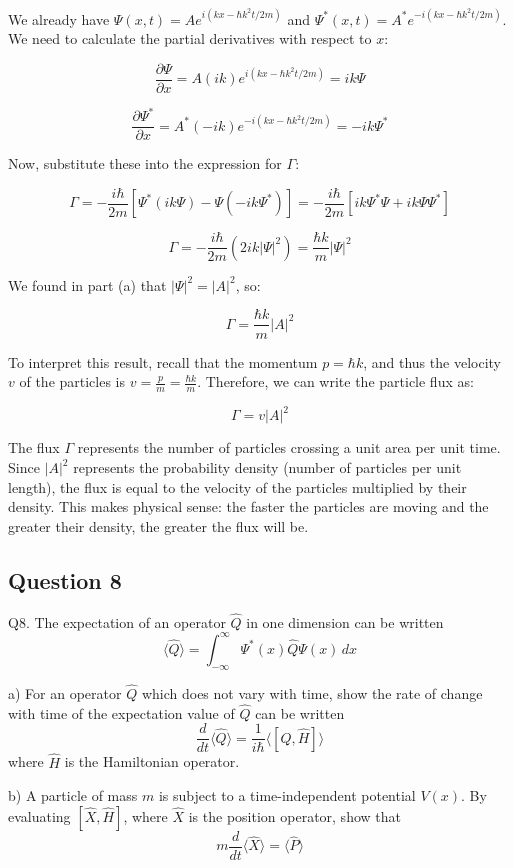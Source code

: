 \documentclass{article}
\begin{document}
We already have $\Psi(x,t) = A e^{i(kx - \hbar k^2 t / 2m)}$ and $\Psi^*(x,t) = A^* e^{-i(kx - \hbar k^2 t / 2m)}$. We need to calculate the partial derivatives with respect to $x$:

\[ \frac{\partial \Psi}{\partial x} = A (ik) e^{i(kx - \hbar k^2 t / 2m)} = ik \Psi \]

\[ \frac{\partial \Psi^*}{\partial x} = A^* (-ik) e^{-i(kx - \hbar k^2 t / 2m)} = -ik \Psi^* \]

Now, substitute these into the expression for $\Gamma$:

\[ \Gamma = -\frac{i \hbar}{2m} \left[ \Psi^* (ik \Psi) - \Psi (-ik \Psi^*) \right] = -\frac{i \hbar}{2m} \left[ ik \Psi^* \Psi + ik \Psi \Psi^* \right] \]

\[ \Gamma = -\frac{i \hbar}{2m} (2ik |\Psi|^2) = \frac{\hbar k}{m} |\Psi|^2 \]

We found in part (a) that $|\Psi|^2 = |A|^2$, so:

\[ \Gamma = \frac{\hbar k}{m} |A|^2 \]

To interpret this result, recall that the momentum $p = \hbar k$, and thus the velocity $v$ of the particles is $v = \frac{p}{m} = \frac{\hbar k}{m}$. Therefore, we can write the particle flux as:

\[ \Gamma = v |A|^2 \]

The flux $\Gamma$ represents the number of particles crossing a unit area per unit time.  Since $|A|^2$ represents the probability density (number of particles per unit length), the flux is equal to the velocity of the particles multiplied by their density. This makes physical sense: the faster the particles are moving and the greater their density, the greater the flux will be.


\subsection{Question 8}
Q8.  
The expectation of an operator $\hat{Q}$ in one dimension can be written  
\[
\langle \hat{Q} \rangle = \int_{-\infty}^{\infty} \Psi^*(x) \hat{Q} \Psi(x) \, dx
\]

a) For an operator $\hat{Q}$ which does not vary with time, show the rate of change with time of the expectation value of $\hat{Q}$ can be written  
\[
\frac{d}{dt} \langle \hat{Q} \rangle = \frac{1}{i\hbar} \langle [\hat{Q}, \hat{H}] \rangle
\]  
where $\hat{H}$ is the Hamiltonian operator.

b) A particle of mass $m$ is subject to a time-independent potential $V(x)$. By evaluating $[\hat{X}, \hat{H}]$, where $\hat{X}$ is the position operator, show that  
\[
m \frac{d}{dt} \langle \hat{X} \rangle = \langle \hat{P} \rangle
\]
\end{document}
